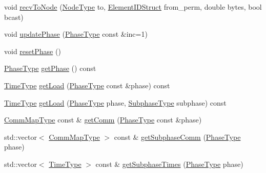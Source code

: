 \begin{DoxyCompactItemize}
\item 
void \hyperlink{structvt_1_1elm_1_1_element_stats_aa0ea8e1310cb4d70a8db1d43523c6064}{recv\+To\+Node} (\hyperlink{namespacevt_a866da9d0efc19c0a1ce79e9e492f47e2}{Node\+Type} to, \hyperlink{structvt_1_1elm_1_1_element_i_d_struct}{Element\+I\+D\+Struct} from\+\_\+perm, double bytes, bool bcast)
\item 
void \hyperlink{structvt_1_1elm_1_1_element_stats_acaa20f9ee9c21209eb1c001b39732029}{update\+Phase} (\hyperlink{namespacevt_a46ce6733d5cdbd735d561b7b4029f6d7}{Phase\+Type} const \&inc=1)
\item 
void \hyperlink{structvt_1_1elm_1_1_element_stats_af9cd414ce031379618bf7a7c6f1e5888}{reset\+Phase} ()
\item 
\hyperlink{namespacevt_a46ce6733d5cdbd735d561b7b4029f6d7}{Phase\+Type} \hyperlink{structvt_1_1elm_1_1_element_stats_a92dc6fcc45664696a7a9a12089b035cd}{get\+Phase} () const
\item 
\hyperlink{namespacevt_a876a9d0cd5a952859c72de8a46881442}{Time\+Type} \hyperlink{structvt_1_1elm_1_1_element_stats_a256c7acd901c72b6813085756200e2b6}{get\+Load} (\hyperlink{namespacevt_a46ce6733d5cdbd735d561b7b4029f6d7}{Phase\+Type} const \&phase) const
\item 
\hyperlink{namespacevt_a876a9d0cd5a952859c72de8a46881442}{Time\+Type} \hyperlink{structvt_1_1elm_1_1_element_stats_ab0480c6cfdcf936df7c780de3a58f2c0}{get\+Load} (\hyperlink{namespacevt_a46ce6733d5cdbd735d561b7b4029f6d7}{Phase\+Type} phase, \hyperlink{namespacevt_ae78cbfdf1e57470e33eedb074f2beeba}{Subphase\+Type} subphase) const
\item 
\hyperlink{namespacevt_1_1elm_a38487cb8896b9b4763efa9022fab560e}{Comm\+Map\+Type} const  \& \hyperlink{structvt_1_1elm_1_1_element_stats_a93b05e0c18f4d929161ccafabaee4ff8}{get\+Comm} (\hyperlink{namespacevt_a46ce6733d5cdbd735d561b7b4029f6d7}{Phase\+Type} const \&phase)
\item 
std\+::vector$<$ \hyperlink{namespacevt_1_1elm_a38487cb8896b9b4763efa9022fab560e}{Comm\+Map\+Type} $>$ const  \& \hyperlink{structvt_1_1elm_1_1_element_stats_aee5101c331562bb1390278a32b13b39b}{get\+Subphase\+Comm} (\hyperlink{namespacevt_a46ce6733d5cdbd735d561b7b4029f6d7}{Phase\+Type} phase)
\item 
std\+::vector$<$ \hyperlink{namespacevt_a876a9d0cd5a952859c72de8a46881442}{Time\+Type} $>$ const  \& \hyperlink{structvt_1_1elm_1_1_element_stats_a979741c0d029ea52a6ba585967becef1}{get\+Subphase\+Times} (\hyperlink{namespacevt_a46ce6733d5cdbd735d561b7b4029f6d7}{Phase\+Type} phase)

\end{DoxyCompactItemize}
